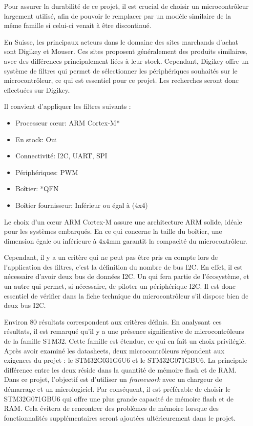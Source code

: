 Pour assurer la durabilité de ce projet, il est crucial de choisir un microcontrôleur largement utilisé, afin de pouvoir le remplacer par un modèle similaire de la même famille si celui-ci venait à être discontinué.

En Suisse, les principaux acteurs dans le domaine des sites marchands d'achat sont Digikey et Mouser.
Ces sites proposent généralement des produits similaires, avec des différences principalement liées à leur stock.
Cependant, Digikey offre un système de filtres qui permet de sélectionner les périphériques souhaités sur le microcontrôleur, ce qui est essentiel pour ce projet.
Les recherches seront donc effectuées sur Digikey.

Il convient d'appliquer les filtres suivants :

\begin{itemize}
    \item Processeur cœur: ARM Cortex-M*
    \item En stock: Oui
    \item Connectivité: I2C, UART, SPI
    \item Périphériques: PWM
    \item Boîtier: *QFN
    \item Boîtier fournisseur: Inférieur ou égal à (4x4)
\end{itemize}

Le choix d'un cœur ARM Cortex-M assure une architecture ARM solide, idéale pour les systèmes embarqués.
En ce qui concerne la taille du boîtier, une dimension égale ou inférieure à 4x4mm garantit la compacité du microcontrôleur.

Cependant, il y a un critère qui ne peut pas être pris en compte lors de l'application des filtres, c'est la définition du nombre de bus I2C.
En effet, il est nécessaire d'avoir deux bus de données I2C.
Un qui fera partie de l'écosystème, et un autre qui permet, si nécessaire, de piloter un périphérique I2C.
Il est donc essentiel de vérifier dans la fiche technique du microcontrôleur s'il dispose bien de deux bus I2C.

Environ 80 résultats correspondent aux critères définis.
En analysant ces résultats, il est remarqué qu'il y a une présence significative de microcontrôleurs de la famille STM32.
Cette famille est étendue, ce qui en fait un choix privilégié.
Après avoir examiné les datasheets, deux microcontrôleurs répondent aux exigences du projet : le STM32G031G6U6 et le STM32G071GBU6.
La principale différence entre les deux réside dans la quantité de mémoire flash et de RAM.
Dans ce projet, l'objectif est d'utiliser un \textit{\gls{framework}} avec un chargeur de démarrage et un micrologiciel.
Par conséquent, il est préférable de choisir le STM32G071GBU6 qui offre une plus grande capacité de mémoire flash et de RAM.
Cela évitera de rencontrer des problèmes de mémoire lorsque des fonctionnalités supplémentaires seront ajoutées ultérieurement dans le projet.

